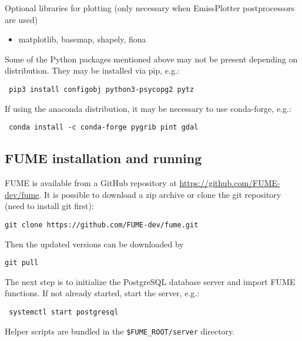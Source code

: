 \documentclass[a4paper,11pt]{article}
\begin{document}
Optional libraries for plotting (only necessary when EmissPlotter
postprocessors are used)
\begin{itemize}
\item
  matplotlib, basemap, shapely, fiona
\end{itemize}

Some of the Python packages mentioned above may not be present depending on distribution. They may be installed via pip, e.g.:
\begin{verbatim}
 pip3 install configobj python3-psycopg2 pytz
\end{verbatim}

If using the anaconda distribution, it may be necessary to use conda-forge, e.g.:
\begin{verbatim}
 conda install -c conda-forge pygrib pint gdal
\end{verbatim}

\subsection{FUME installation and running}\label{fume-installation}
FUME is available from a GitHub repository at \url{https://github.com/FUME-dev/fume}. It is possible to download a zip archive or clone the git repository (need to install git first):
\begin{verbatim}
git clone https://github.com/FUME-dev/fume.git
\end{verbatim}
Then the updated versions can be downloaded by
\begin{verbatim}
git pull
\end{verbatim}

The next step is to initialize the PostgreSQL database server and import FUME functions. If not already started, start the server, e.g.:
\begin{verbatim}
 systemctl start postgresql 
\end{verbatim}

Helper scripts are bundled in the \verb|$FUME_ROOT/server| directory.
\end{document}
